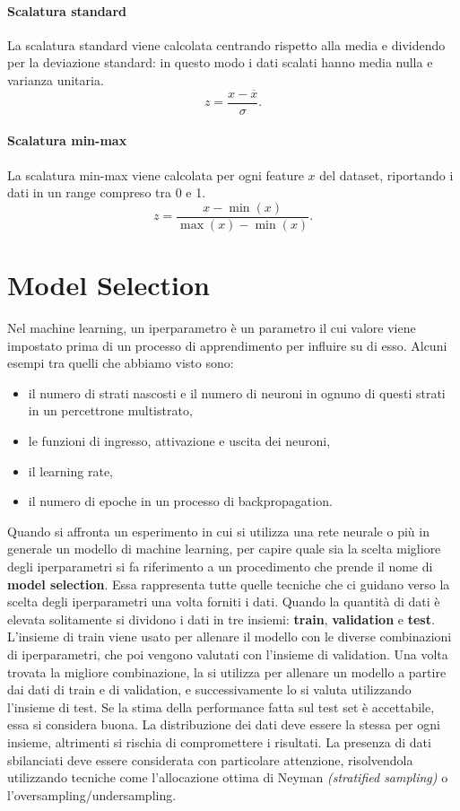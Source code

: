 \documentclass[12pt, twoside, letterpaper]{report}
\begin{document}
				\paragraph{Scalatura standard} La scalatura standard viene calcolata centrando rispetto alla media e dividendo per la deviazione standard: in questo modo i dati scalati hanno media nulla e varianza unitaria. $$z = \frac{x - \overline{x}}{\sigma}.$$
				
				\paragraph{Scalatura min-max} La scalatura min-max viene calcolata per ogni feature $x$ del dataset, riportando i dati in un range compreso tra 0 e 1. $$z = \frac{x - \min(x)}{\max(x) - \min(x)}.$$
			
		\section{Model Selection} 
			Nel machine learning, un iperparametro è un parametro il cui valore viene impostato prima di un processo di apprendimento per influire su di esso. Alcuni esempi tra quelli che abbiamo visto sono: 
			\begin{itemize}
				\item il numero di strati nascosti e il numero di neuroni in ognuno di questi strati in un percettrone multistrato,
				\item le funzioni di ingresso, attivazione e uscita dei neuroni, 
				\item il learning rate,
				\item il numero di epoche in un processo di backpropagation.
			\end{itemize}
			Quando si affronta un esperimento in cui si utilizza una rete neurale o più in generale un modello di machine learning, per capire quale sia la scelta migliore degli iperparametri si fa riferimento a un procedimento che prende il nome di \textbf{model selection}. Essa rappresenta tutte quelle tecniche che ci guidano verso la scelta degli iperparametri una volta forniti i dati. Quando la quantità di dati è elevata solitamente si dividono i dati in tre insiemi: \textbf{train}, \textbf{validation} e \textbf{test}. L'insieme di train viene usato per allenare il modello con le diverse combinazioni di iperparametri, che poi vengono valutati con l'insieme di validation. Una volta trovata la migliore combinazione, la si utilizza per allenare un modello a partire dai dati di train e di validation, e successivamente lo si valuta utilizzando l'insieme di test. Se la stima della performance fatta sul test set è accettabile, essa si considera buona. La distribuzione dei dati deve essere la stessa per ogni insieme, altrimenti si rischia di compromettere i risultati. La presenza di dati sbilanciati deve essere considerata con particolare attenzione, risolvendola utilizzando tecniche come l'allocazione ottima di Neyman \textit{(stratified sampling)} \cite{neyman} o l'oversampling/undersampling. 
			
\end{document}
